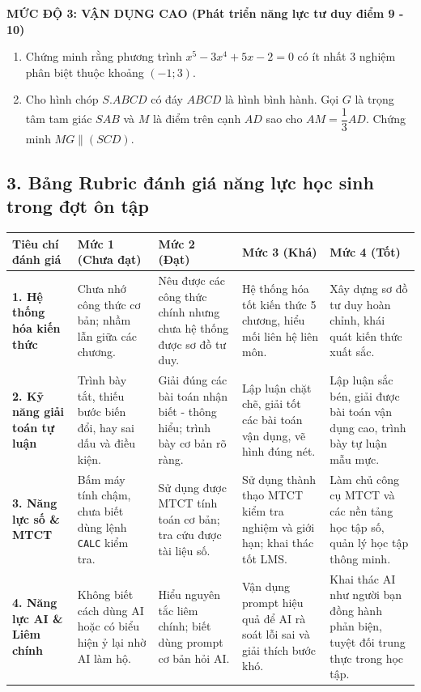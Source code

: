 \documentclass[12pt, a4paper]{article}
\begin{document}
\noindent \textbf{MỨC ĐỘ 3: VẬN DỤNG CAO (Phát triển năng lực tư duy điểm 9 - 10)}
\begin{enumerate}
    \item Chứng minh rằng phương trình $x^5 - 3x^4 + 5x - 2 = 0$ có ít nhất 3 nghiệm phân biệt thuộc khoảng $(-1; 3)$.
    \item Cho hình chóp $S.ABCD$ có đáy $ABCD$ là hình bình hành. Gọi $G$ là trọng tâm tam giác $SAB$ và $M$ là điểm trên cạnh $AD$ sao cho $AM = \dfrac{1}{3}AD$. Chứng minh $MG \parallel (SCD)$.
\end{enumerate}

\subsection*{3. Bảng Rubric đánh giá năng lực học sinh trong đợt ôn tập}

\begin{center}
\renewcommand{\arraystretch}{1.25}
\begin{tabularx}{\textwidth}{|p{2.8cm}|X|X|X|X|}
    \hline
    \textbf{Tiêu chí đánh giá} & \textbf{Mức 1 (Chưa đạt)} & \textbf{Mức 2 (Đạt)} & \textbf{Mức 3 (Khá)} & \textbf{Mức 4 (Tốt)} \\
    \hline
    \textbf{1. Hệ thống hóa kiến thức} & Chưa nhớ công thức cơ bản; nhầm lẫn giữa các chương. & Nêu được các công thức chính nhưng chưa hệ thống được sơ đồ tư duy. & Hệ thống hóa tốt kiến thức 5 chương, hiểu mối liên hệ liên môn. & Xây dựng sơ đồ tư duy hoàn chỉnh, khái quát kiến thức xuất sắc. \\
    \hline
    \textbf{2. Kỹ năng giải toán tự luận} & Trình bày tắt, thiếu bước biến đổi, hay sai dấu và điều kiện. & Giải đúng các bài toán nhận biết - thông hiểu; trình bày cơ bản rõ ràng. & Lập luận chặt chẽ, giải tốt các bài toán vận dụng, vẽ hình đúng nét. & Lập luận sắc bén, giải được bài toán vận dụng cao, trình bày tự luận mẫu mực. \\
    \hline
    \textbf{3. Năng lực số \& MTCT} & Bấm máy tính chậm, chưa biết dùng lệnh \texttt{CALC} kiểm tra. & Sử dụng được MTCT tính toán cơ bản; tra cứu được tài liệu số. & Sử dụng thành thạo MTCT kiểm tra nghiệm và giới hạn; khai thác tốt LMS. & Làm chủ công cụ MTCT và các nền tảng học tập số, quản lý học tập thông minh. \\
    \hline
    \textbf{4. Năng lực AI \& Liêm chính} & Không biết cách dùng AI hoặc có biểu hiện ỷ lại nhờ AI làm hộ. & Hiểu nguyên tắc liêm chính; biết dùng prompt cơ bản hỏi AI. & Vận dụng prompt hiệu quả để AI rà soát lỗi sai và giải thích bước khó. & Khai thác AI như người bạn đồng hành phản biện, tuyệt đối trung thực trong học tập. \\
    \hline
\end{tabularx}
\end{center}
\end{document}
